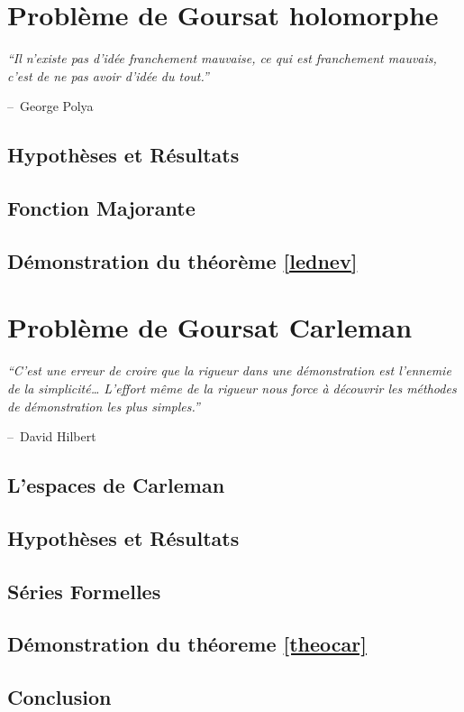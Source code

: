 \documentclass[12pt,a4paper]{report}
\makeatletter
\theoremstyle{plain}
\theoremstyle{definition}
\theoremstyle{remark}
\newenvironment{chapquote}[2][2em]
  {\setlength{\@tempdima}{#1}%
   \def\chapquote@author{#2}%
   \parshape 1 \@tempdima \dimexpr\textwidth-2\@tempdima\relax%
   \itshape}
  {\par\normalfont\hfill--\ \chapquote@author\hspace*{\@tempdima}\par\bigskip}
\makeatother
\begin{document}






\chapter{Problème de Goursat holomorphe}
\begin{chapquote}{George Polya}
``Il n’existe pas d'idée franchement mauvaise, ce qui est franchement mauvais, c'est de ne pas avoir d'idée du tout.''
\end{chapquote}

\section{Hypothèses et Résultats}


\section{Fonction Majorante}

   
  \section{Démonstration du théorème \ref{lednev}}
 

 
 \chapter{Problème de Goursat Carleman}

 
 \begin{chapquote}{David Hilbert}
``C’est une erreur de croire que la rigueur dans une démonstration est l’ennemie de la simplicité… L’effort même de la rigueur nous force à découvrir les méthodes de démonstration les plus simples.''
\end{chapquote}
 
 \section{L'espaces de Carleman}
 
\section{Hypothèses et Résultats}

 \section{Séries Formelles}
 
 
\section{Démonstration du théoreme \ref{theocar}}

\section{Conclusion}




				
\nocite{*} 

%
%

\end{document}
